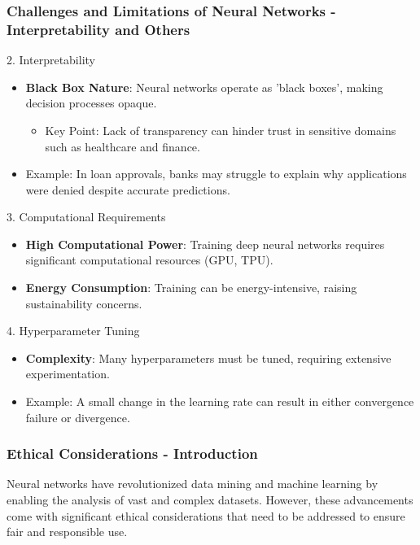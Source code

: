\documentclass[aspectratio=169]{beamer}
\begin{document}
\begin{frame}[fragile]
    \frametitle{Challenges and Limitations of Neural Networks - Interpretability and Others}
    \begin{block}{2. Interpretability}
        \begin{itemize}
            \item \textbf{Black Box Nature}: Neural networks operate as 'black boxes', making decision processes opaque.
                \begin{itemize}
                    \item Key Point: Lack of transparency can hinder trust in sensitive domains such as healthcare and finance.
                \end{itemize}
            \item Example: In loan approvals, banks may struggle to explain why applications were denied despite accurate predictions.
        \end{itemize}
    \end{block}

    \begin{block}{3. Computational Requirements}
        \begin{itemize}
            \item \textbf{High Computational Power}: Training deep neural networks requires significant computational resources (GPU, TPU).
            \item \textbf{Energy Consumption}: Training can be energy-intensive, raising sustainability concerns.
        \end{itemize}
    \end{block}

    \begin{block}{4. Hyperparameter Tuning}
        \begin{itemize}
            \item \textbf{Complexity}: Many hyperparameters must be tuned, requiring extensive experimentation.
            \item Example: A small change in the learning rate can result in either convergence failure or divergence.
        \end{itemize}
    \end{block}
\end{frame}

\begin{frame}[fragile]
  \frametitle{Ethical Considerations - Introduction}
  Neural networks have revolutionized data mining and machine learning by enabling the analysis of vast and complex datasets. However, these advancements come with significant ethical considerations that need to be addressed to ensure fair and responsible use.
\end{frame}
\end{document}
